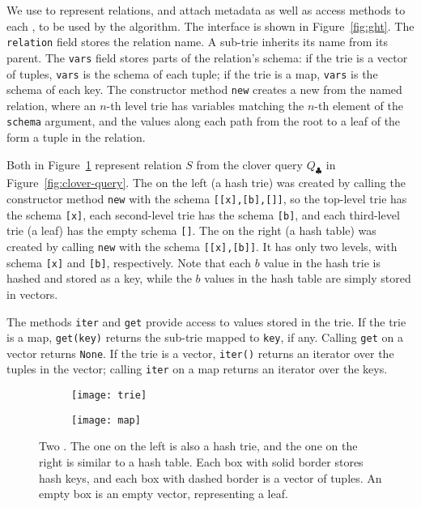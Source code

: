 We use \GHTs to represent relations,
  and attach metadata as well as access methods 
  to each \GHT, to be used by the \FJ algorithm.
The \GHT interface is shown in Figure~\ref{fig:ght}.
The \lstinline|relation| field stores the relation name.
A sub-trie inherits its name from its parent.
The \lstinline|vars| field stores parts of the relation's schema:
  if the trie is a vector of tuples, 
  \lstinline|vars| is the schema of each tuple;
  if the trie is a map, 
  \lstinline|vars| is the schema of each key.
The constructor method \lstinline|new| creates a new \GHT from the named relation, 
  where an $n$-th level trie has variables
  matching the $n$-th element of the \lstinline|schema| argument,
  and the values along each path from the root to a leaf of the \GHT 
  form a tuple in the relation.

\begin{example}
  Both \GHTs in Figure~\ref{fig:ght-examples} represent relation $S$ from the
  clover query $Q_\clubsuit$ in Figure~\ref{fig:clover-query}.  The
  \GHT on the left (a hash trie) was created by calling the
  constructor method \lstinline|new| with the schema
  \lstinline|[[x],[b],[]]|, so the top-level trie has the schema
  \lstinline|[x]|, each second-level trie has the schema
  \lstinline|[b]|, and each third-level trie (a leaf) has the empty
  schema \lstinline|[]|.  The \GHT on the right (a hash table) was
  created by calling \lstinline|new| with the schema
  \lstinline|[[x],[b]]|.  It has only two levels, with schema
  \lstinline|[x]| and \lstinline|[b]|, respectively.  Note that each
  $b$ value in the hash trie is hashed and stored as a key, while the
  $b$ values in the hash table are simply stored in vectors.
\end{example}

The methods \lstinline|iter| and \lstinline|get| 
  provide access to values stored in the trie.
If the trie is a map, 
  \lstinline|get(key)| returns the sub-trie mapped to \lstinline|key|,
  if any.
Calling \texttt{get} on a vector returns \lstinline|None|.
If the trie is a vector, 
  \lstinline|iter()|
  returns an iterator over the tuples in the vector;
  calling \texttt{iter} on a map 
  returns an iterator over the keys.

\begin{figure}
  \centering
  \begin{subfigure}[c]{0.3\linewidth}
  \texttt{[image: trie]}
  \end{subfigure}\hspace{1.5cm}%
  \begin{subfigure}[c]{0.3\linewidth}
  \texttt{[image: map]}
  \end{subfigure} 
  \caption{
    Two \GHTs. The one on the left is also a hash trie, 
      and the one on the right is similar to a hash table.
    Each box with solid border stores hash keys, 
    and each box with dashed border is a vector of tuples.
    An empty box is an empty vector, representing a leaf.
  }
  \label{fig:ght-examples}
\end{figure}

